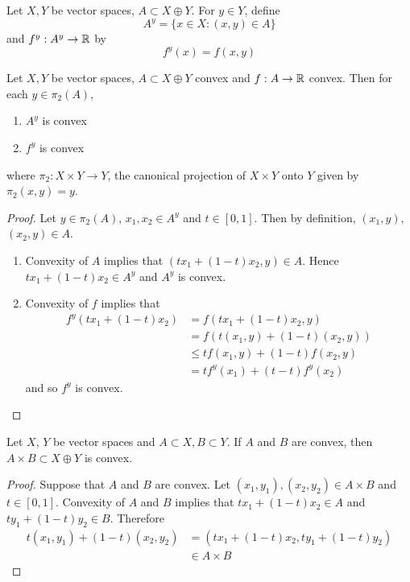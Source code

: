 \documentclass{book}
\begin{document}
	
	\begin{defn} 
	Let $X, Y$ be vector spaces, $A \subset X \oplus Y$. For $y \in Y$, define $$A^y = \{x \in X: (x,y) \in A \}$$ and $f^y:A^y \rightarrow \mathbb{R}$ by $$f^y(x) = f(x,y)$$
	\end{defn}
	
	\begin{ex} 
	Let $X, Y$ be vector spaces, $A \subset X \oplus Y$ convex and $f:A \rightarrow \mathbb{R}$ convex. Then for each $y \in \pi_2(A)$,
	\begin{enumerate}
	\item $A^y$ is convex 
	\item $f^y$ is convex  
	\end{enumerate}	  
	where $\pi_2: X\times Y \rightarrow Y$, the canonical projection of $X \times Y$ onto $Y$ given by $\pi_2(x,y) = y$.
	\end{ex}
	
	\begin{proof}
	Let $y \in \pi_2(A)$, $x_1, x_2 \in A^y$ and $t \in [0,1]$. Then by definition, $(x_1, y)$, $(x_2, y) \in A$.
	\begin{enumerate}
	\item  Convexity of $A$ implies that $(tx_1 + (1-t)x_2, y) \in A$. Hence $tx_1 + (1-t)x_2 \in A^y$ and $A^y$ is convex. 
	\item Convexity of $f$ implies that 
	\begin{align*}
	f^y(tx_1 + (1-t)x_2)
	&= f(tx_1 + (1-t)x_2, y) \\
	&= f(t(x_1, y) + (1-t)(x_2,y)) \\
	& \leq tf(x_1, y) + (1-t) f(x_2,y) \\
	&= tf^y(x_1) + (t-t)f^y(x_2)
\end{align*}	  
	and so $f^y$ is convex.
	\end{enumerate}
	\end{proof}
	
	\begin{ex} 
	Let $X$, $Y$ be vector spaces and $A\subset X, B \subset Y$. If $A$ and $B$ are convex, then $A \times B \subset X \oplus Y$ is convex.
	\end{ex}	
	
	\begin{proof}
	Suppose that $A$ and $B$ are convex. Let $(x_1,y_1), (x_2,y_2) \in A \times B$ and $t \in [0,1]$. Convexity of $A$ and $B$ implies that $tx_1 + (1-t)x_2 \in A$ and $ty_1 + (1-t)y_2 \in B$. Therefore 
	\begin{align*}
	t(x_1,y_1) + (1-t)(x_2,y_2) 
	&= (tx_1 + (1-t)x_2, ty_1 + (1-t)y_2) \\
	& \in A \times B
\end{align*}	 
	\end{proof}
	
\end{document}

